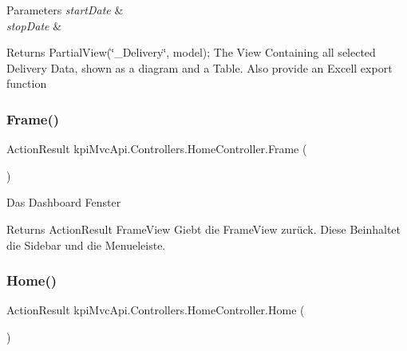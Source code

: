 \begin{DoxyParams}{Parameters}
{\em start\+Date} & \\
\hline
{\em stop\+Date} & \\
\hline
\end{DoxyParams}
\begin{DoxyReturn}{Returns}
{\ttfamily Partial\+View(\char`\"{}\+\_\+\+Delivery\char`\"{}, model);} The View Containing all selected Delivery Data, shown as a diagram and a Table. Also provide an Excell export function 
\end{DoxyReturn}
\mbox{\label{classkpi_mvc_api_1_1_controllers_1_1_home_controller_a8fe51f06ec9db44e1766f89691af44f6}} 
\subsubsection{\texorpdfstring{Frame()}{Frame()}}
{\footnotesize\ttfamily Action\+Result kpi\+Mvc\+Api.\+Controllers.\+Home\+Controller.\+Frame (\begin{DoxyParamCaption}{ }\end{DoxyParamCaption})\hspace{0.3cm}{\ttfamily [inline]}}



Das Dashboard Fenster 

\begin{DoxyReturn}{Returns}
{\ttfamily Action\+Result Frame\+View} Giebt die Frame\+View zurück. Diese Beinhaltet die Sidebar und die Menueleiste. 
\end{DoxyReturn}
\mbox{\label{classkpi_mvc_api_1_1_controllers_1_1_home_controller_a71cc0c383f8e44677455f0caf590e0a7}} 
\subsubsection{\texorpdfstring{Home()}{Home()}}
{\footnotesize\ttfamily Action\+Result kpi\+Mvc\+Api.\+Controllers.\+Home\+Controller.\+Home (\begin{DoxyParamCaption}{ }\end{DoxyParamCaption})\hspace{0.3cm}{\ttfamily [inline]}}



